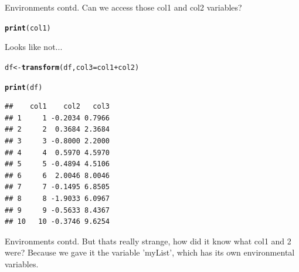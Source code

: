 \documentclass{beamer}\usepackage[]{graphicx}\usepackage[]{color}
\makeatletter
\newcommand{\hlopt}[1]{\textcolor[rgb]{0,0,0}{#1}}%
\newcommand{\hlstd}[1]{\textcolor[rgb]{0.345,0.345,0.345}{#1}}%
\newcommand{\hlkwb}[1]{\textcolor[rgb]{0.69,0.353,0.396}{#1}}%
\newcommand{\hlkwc}[1]{\textcolor[rgb]{0.333,0.667,0.333}{#1}}%
\newcommand{\hlkwd}[1]{\textcolor[rgb]{0.737,0.353,0.396}{\textbf{#1}}}%
\newenvironment{kframe}{%
 \def\at@end@of@kframe{}%
 \ifinner\ifhmode%
  \def\at@end@of@kframe{\end{minipage}}%
  \begin{minipage}{\columnwidth}%
 \fi\fi%
 \def\FrameCommand##1{\hskip\@totalleftmargin \hskip-\fboxsep
 \colorbox{shadecolor}{##1}\hskip-\fboxsep
     \hskip-\linewidth \hskip-\@totalleftmargin \hskip\columnwidth}%
 \MakeFramed {\advance\hsize-\width
   \@totalleftmargin\z@ \linewidth\hsize
   \@setminipage}}%
 {\par\unskip\endMakeFramed%
 \at@end@of@kframe}
\newenvironment{knitrout}{}{} %
\makeatother
\begin{document}
\begin{frame}[fragile]{Environments contd.}
Can we access those col1 and col2 variables?
\begin{knitrout}
\color{fgcolor}\begin{kframe}
\begin{alltt}
\hlkwd{print}\hlstd{(col1)}
\end{alltt}


{\ttfamily\noindent\bfseries\color{errorcolor}{\#\# Error: object 'col1' not found}}\end{kframe}
\end{knitrout}
Looks like not... 
\begin{knitrout}
\color{fgcolor}\begin{kframe}
\begin{alltt}
\hlstd{df} \hlkwb{<-} \hlkwd{transform}\hlstd{(df,} \hlkwc{col3}\hlstd{=col1}\hlopt{+}\hlstd{col2)}

\hlkwd{print}\hlstd{(df)}
\end{alltt}
\begin{verbatim}
##    col1    col2   col3
## 1     1 -0.2034 0.7966
## 2     2  0.3684 2.3684
## 3     3 -0.8000 2.2000
## 4     4  0.5970 4.5970
## 5     5 -0.4894 4.5106
## 6     6  2.0046 8.0046
## 7     7 -0.1495 6.8505
## 8     8 -1.9033 6.0967
## 9     9 -0.5633 8.4367
## 10   10 -0.3746 9.6254
\end{verbatim}
\end{kframe}
\end{knitrout}
\end{frame}

\begin{frame}[fragile]{Environments contd.}
But thats really strange, how did it know what col1 and 2 were?
\linebreak
\linebreak
\pause
Because we gave it the variable 'myList', which has its own environmental variables.
\end{frame}
\end{document}

